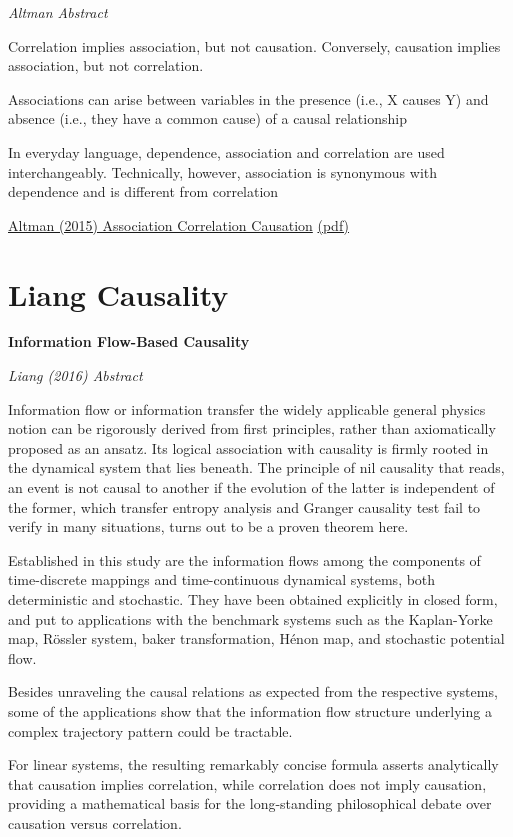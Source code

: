 \documentclass[
]{book}
\begin{document}
\emph{Altman Abstract}

Correlation implies association, but not causation.
Conversely, causation implies association, but not correlation.

Associations can arise between variables in the presence (i.e., X causes Y) and
absence (i.e., they have a common cause) of a causal relationship

In everyday language, dependence, association and correlation are used interchangeably. Technically, however, association is synonymous with dependence and is different from correlation

\href{https://www.nature.com/articles/nmeth.3587}{Altman (2015) Association Correlation Causation}
\href{pdf/Altman_2015_Association_Correlation_and_Causation.pdf}{(pdf)}

\hypertarget{liang-causality}{%
\section{Liang Causality}\label{liang-causality}}

\textbf{Information Flow-Based Causality}

\emph{Liang (2016) Abstract}

Information flow or information transfer the widely applicable
general physics notion can be rigorously derived
from first principles, rather than axiomatically proposed as an ansatz.
Its logical association with causality is firmly rooted in the dynamical
system that lies beneath.
The principle of nil causality that reads, an event is not causal to another
if the evolution of the latter is independent of the former,
which transfer entropy analysis and Granger causality test fail to verify
in many situations, turns out to be a proven theorem here.

Established in this study are the information flows among the components of
time-discrete mappings and time-continuous dynamical systems,
both deterministic and stochastic.
They have been obtained explicitly in closed form, and put to applications
with the benchmark systems such as the Kaplan-Yorke map, Rössler system,
baker transformation, Hénon map, and stochastic potential flow.

Besides unraveling the causal relations as expected from the respective systems,
some of the applications show that the information flow structure underlying a
complex trajectory pattern could be tractable.

For linear systems, the resulting remarkably concise formula asserts analytically that
causation implies correlation,
while correlation does not imply causation,
providing a mathematical basis for the long-standing philosophical debate
over causation versus correlation.
\end{document}
